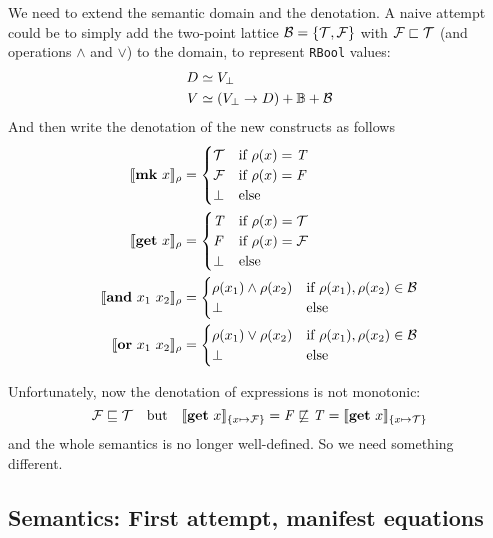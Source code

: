 \documentclass[manuscript,screen,acmsmall,nonacm]{acmart}
\begin{document}
We need to extend the semantic domain and the denotation. A naive attempt could be to simply add the two-point lattice $\mathcal B = \{ \mathcal T, \mathcal F \}$ with $\mathcal F \sqsubset \mathcal T$ (and operations $\wedge$ and $\vee$) to the domain, to represent \texttt{RBool} values:
\begin{align*}
D &\simeq V_\bot \\
V &\simeq (V_\bot \to D) + \mathbb B + \mathcal B
\end{align*}
And then write the denotation of the new constructs as follows
\begin{align*}
\llbracket \mathbf{mk}~x \rrbracket_\rho &=
\begin{cases}
\mathcal T &\text{if } \rho(x) = \mathit T \\
\mathcal F &\text{if } \rho(x)  = \mathit F \\
\bot &\text{else}
\end{cases} \\
\llbracket \mathbf{get}~x \rrbracket_\rho &=
\begin{cases}
\mathit T &\text{if } \rho(x) = \mathcal T \\
\mathit F &\text{if } \rho(x)  = \mathcal F \\
\bot &\text{else}
\end{cases} \\
\llbracket \mathbf{and}~x_1~x_2 \rrbracket_\rho &=
\begin{cases}
\rho(x_1) \wedge \rho(x_2) &\text{if } \rho(x_1), \rho(x_2) \in \mathcal B \\
\bot &\text{else}
\end{cases} \\
\llbracket \mathbf{or}~x_1~x_2 \rrbracket_\rho &=
\begin{cases}
\rho(x_1) \vee \rho(x_2) &\text{if } \rho(x_1), \rho(x_2) \in \mathcal B \\
\bot &\text{else}
\end{cases} \\
\end{align*}

Unfortunately, now the denotation of expressions is not monotonic:
\[
\mathcal F \sqsubseteq \mathcal T
\quad\text{but}\quad
\llbracket \mathbf{get}~x \rrbracket_{\{x \mapsto \mathcal F\}} = \mathit F
\not\sqsubseteq
\mathit T = \llbracket \mathbf{get}~x \rrbracket_{\{x \mapsto \mathcal T\}}
\]
and the whole semantics is no longer well-defined. So we need something different.

\subsection{Semantics: First attempt, manifest equations}
\end{document}
